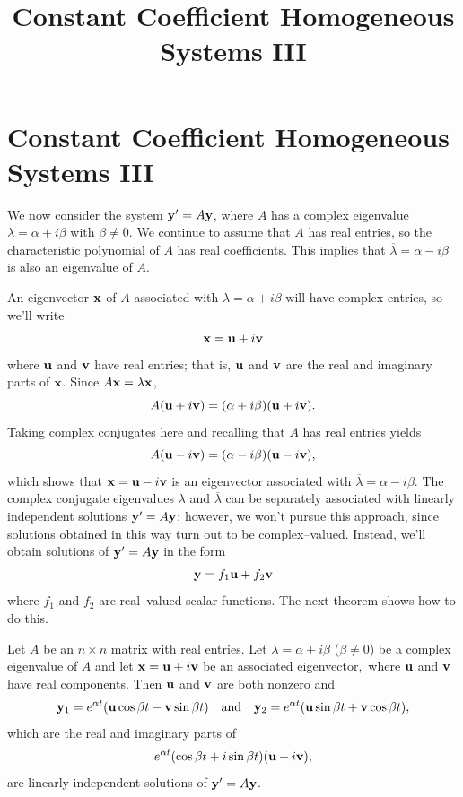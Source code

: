 \documentclass{ximera}
\title{Constant Coefficient Homogeneous Systems III}%
\begin{document}
\begin{abstract}

\end{abstract}

\maketitle

\section*{Constant Coefficient Homogeneous Systems III}

We now consider the system ${\bf y}'=A{\bf y}$, where $A$ has a complex
eigenvalue $\lambda=\alpha+i\beta$ with $\beta\ne0$. We continue to
assume that $A$ has real entries, so the characteristic polynomial of
$A$ has real coefficients. This implies that
$\overline\lambda=\alpha-i\beta$ is also an eigenvalue of $A$.

An eigenvector ${\bf x}$ of $A$ associated with
$\lambda=\alpha+i\beta$ will have complex entries, so we'll write
$$
{\bf x}={\bf u}+i{\bf v}
$$
where ${\bf u}$ and ${\bf v}$ have real entries; that is, ${\bf u}$
and ${\bf v}$ are the real and imaginary parts of ${\bf x}$. Since
$A{\bf x}=\lambda {\bf x}$,
\begin{equation} \label{eq:10.6.1}
A({\bf u}+i{\bf v})=(\alpha+i\beta)({\bf u}+i{\bf v}).
\end{equation}
Taking complex conjugates here and recalling that $A$ has real entries
yields
$$
A({\bf u}-i{\bf v})=(\alpha-i\beta)({\bf u}-i{\bf v}),
$$
which shows that ${\bf x}={\bf u}-i{\bf v}$ is an eigenvector
associated with $\overline{\lambda}=\alpha-i\beta$. The complex
conjugate eigenvalues $\lambda$ and $\overline{\lambda}$ can be
separately associated with linearly independent solutions ${\bf
y}'=A{\bf y}$;     however, we won't pursue this approach, since solutions
obtained in this way turn out to be complex--valued. Instead, we'll
obtain solutions of ${\bf y}'=A{\bf y}$ in the form
\begin{equation} \label{eq:10.6.2}
{\bf y}=f_1{\bf u}+f_2{\bf v}
\end{equation}
where $f_1$ and $f_2$ are real--valued scalar functions.
The next theorem shows how to do this.

\begin{theorem}\label{thmtype:10.6.1}
Let $A$ be an $n\times n$ matrix with real entries$.$ Let
$\lambda=\alpha+i\beta$ ($\beta\neq 0$) be a complex
eigenvalue of $A$ and let ${\bf x}={\bf u}+i{\bf v}$ be an associated
eigenvector$,$ where ${\bf u}$ and ${\bf v}$ have real components$.$ Then
${\bf u}$ and ${\bf v}$ are both nonzero and
$$
{\bf y}_1=e^{\alpha t}({\bf u}\cos\beta t-{\bf v}\sin\beta t)
\quad\mbox{and}\quad
{\bf y}_2=e^{\alpha t}({\bf u}\sin\beta t+{\bf v}\cos\beta t),
$$
which are the real and imaginary parts of
\begin{equation} \label{eq:10.6.3}
e^{\alpha t}(\cos\beta t+i\sin\beta t)({\bf u}+i{\bf v}),
\end{equation}
are linearly independent solutions of  ${\bf y}'=A{\bf y}$.
\end{theorem}
\end{document}
